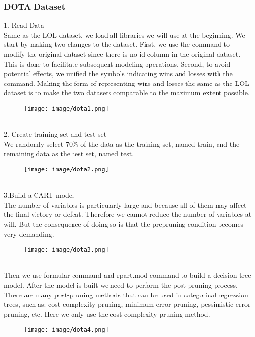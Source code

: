 \documentclass[a4paper,fleqn]{cas-sc}
\begin{document}
\subsubsection{DOTA Dataset}
 1. Read Data\\
Same as the LOL dataset, we load all libraries we will use at the beginning. We start by making two changes to the dataset. First, we use the command to modify the original dataset since there is no id column in the original dataset. This is done to facilitate subsequent modeling operations. Second, to avoid potential effects, we unified the symbols indicating wins and losses with the command. Making the form of representing wins and losses the same as the LOL dataset is to make the two datasets comparable to the maximum extent possible.\\
\begin{figure}[h!]
	\centering
		\texttt{[image: image/dota1.png]}
	\caption{}
	\label{FIG:1}
\end{figure}\\
2. Create training set and test set\\
We randomly select $70 \%$ of the data as the training set, named train, and the remaining data as the test set, named test.\\
\begin{figure}[h!]
	\centering
		\texttt{[image: image/dota2.png]}
	\caption{}
	\label{FIG:1}
\end{figure}\\
3.Build a CART model\\
The number of variables is particularly large and because all of them may affect the final victory or defeat. Therefore we cannot reduce the number of variables at will. But the consequence of doing so is that the prepruning condition becomes very demanding.\\
\begin{figure}[h!]
	\centering
		\texttt{[image: image/dota3.png]}
	\caption{}
	\label{FIG:1}
\end{figure}\\
Then we use formular command and rpart.mod command to build a decision tree model. After the model is built we need to perform the post-pruning process. There are many post-pruning methods that can be used in categorical regression trees, such as: cost complexity pruning, minimum error pruning, pessimistic error pruning, etc. Here we only use the cost complexity pruning method.\\
\begin{figure}[h!]
	\centering
		\texttt{[image: image/dota4.png]}
	\caption{}
	\label{FIG:1}
\end{figure}\\
\end{document}
